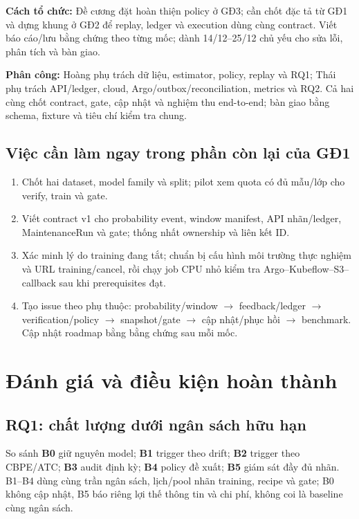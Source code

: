 \documentclass[11pt,a4paper]{article}
\begin{document}
\textbf{Cách tổ chức:} Đề cương đặt hoàn thiện policy ở GĐ3; cần chốt đặc tả từ GĐ1 và dựng khung ở GĐ2 để replay, ledger và execution dùng cùng contract. Viết báo cáo/lưu bằng chứng theo từng mốc; dành 14/12--25/12 chủ yếu cho sửa lỗi, phân tích và bàn giao.

\textbf{Phân công:} Hoàng phụ trách dữ liệu, estimator, policy, replay và RQ1; Thái phụ trách API/ledger, cloud, Argo/outbox/reconciliation, metrics và RQ2. Cả hai cùng chốt contract, gate, cập nhật và nghiệm thu end-to-end; bàn giao bằng schema, fixture và tiêu chí kiểm tra chung.

\subsection{Việc cần làm ngay trong phần còn lại của GĐ1}
\begin{samepage}
\begin{enumerate}
  \item Chốt hai dataset, model family và split; pilot xem quota có đủ mẫu/lớp cho verify, train và gate.
  \item Viết contract v1 cho probability event, window manifest, API nhãn/ledger, MaintenanceRun và gate; thống nhất ownership và liên kết ID.
  \item Xác minh lý do training đang tắt; chuẩn bị cấu hình môi trường thực nghiệm và URL training/cancel, rồi chạy job CPU nhỏ kiểm tra Argo--Kubeflow--S3--callback sau khi prerequisites đạt.
  \item Tạo issue theo phụ thuộc: probability/window $\rightarrow$ feedback/ledger $\rightarrow$ verification/policy $\rightarrow$ snapshot/gate $\rightarrow$ cập nhật/phục hồi $\rightarrow$ benchmark. Cập nhật roadmap bằng bằng chứng sau mỗi mốc.
\end{enumerate}
\end{samepage}

\section{Đánh giá và điều kiện hoàn thành}
\subsection{RQ1: chất lượng dưới ngân sách hữu hạn}
So sánh \textbf{B0} giữ nguyên model; \textbf{B1} trigger theo drift; \textbf{B2} trigger theo CBPE/ATC; \textbf{B3} audit định kỳ; \textbf{B4} policy đề xuất; \textbf{B5} giám sát đầy đủ nhãn. B1--B4 dùng cùng trần ngân sách, lịch/pool nhãn training, recipe và gate; B0 không cập nhật, B5 báo riêng lợi thế thông tin và chi phí, không coi là baseline cùng ngân sách.
\end{document}
